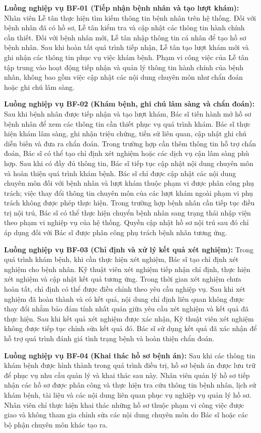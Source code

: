 \textbf{Luồng nghiệp vụ BF-01 (Tiếp nhận bệnh nhân và tạo lượt khám):}
Nhân viên Lễ tân thực hiện tìm kiếm thông tin bệnh nhân trên hệ thống. Đối với bệnh nhân đã có hồ sơ, Lễ tân kiểm tra và cập nhật các thông tin hành chính cần thiết. Đối với bệnh nhân mới, Lễ tân nhập thông tin cá nhân để tạo hồ sơ bệnh nhân. Sau khi hoàn tất quá trình tiếp nhận, Lễ tân tạo lượt khám mới và ghi nhận các thông tin phục vụ việc khám bệnh. Phạm vi công việc của Lễ tân tập trung vào hoạt động tiếp nhận và quản lý thông tin hành chính của bệnh nhân, không bao gồm việc cập nhật các nội dung chuyên môn như chẩn đoán hoặc ghi chú lâm sàng.

\textbf{Luồng nghiệp vụ BF-02 (Khám bệnh, ghi chú lâm sàng và chẩn đoán):}
Sau khi bệnh nhân được tiếp nhận và tạo lượt khám, Bác sĩ tiến hành mở hồ sơ bệnh nhân để xem các thông tin cần thiết phục vụ quá trình khám. Bác sĩ thực hiện khám lâm sàng, ghi nhận triệu chứng, tiền sử liên quan, cập nhật ghi chú diễn biến và đưa ra chẩn đoán. Trong trường hợp cần thêm thông tin hỗ trợ chẩn đoán, Bác sĩ có thể tạo chỉ định xét nghiệm hoặc các dịch vụ cận lâm sàng phù hợp. Sau khi có đầy đủ thông tin, Bác sĩ tiếp tục cập nhật nội dung chuyên môn và hoàn thiện quá trình khám bệnh. Bác sĩ chỉ được cập nhật các nội dung chuyên môn đối với bệnh nhân và lượt khám thuộc phạm vi được phân công phụ trách; việc thay đổi thông tin chuyên môn của các lượt khám ngoài phạm vi phụ trách không được phép thực hiện. Trong trường hợp bệnh nhân cần tiếp tục điều trị nội trú, Bác sĩ có thể thực hiện chuyển bệnh nhân sang trạng thái nhập viện theo phạm vi nghiệp vụ của hệ thống. Quyền cập nhật hồ sơ nội trú sau đó chỉ áp dụng đối với Bác sĩ được phân công phụ trách bệnh nhân tương ứng.

\textbf{Luồng nghiệp vụ BF-03 (Chỉ định và xử lý kết quả xét nghiệm):}
Trong quá trình khám bệnh, khi cần thực hiện xét nghiệm, Bác sĩ tạo chỉ định xét nghiệm cho bệnh nhân. Kỹ thuật viên xét nghiệm tiếp nhận chỉ định, thực hiện xét nghiệm và cập nhật kết quả tương ứng. Trong thời gian xét nghiệm chưa hoàn tất, chỉ định có thể được điều chỉnh theo yêu cầu nghiệp vụ. Sau khi xét nghiệm đã hoàn thành và có kết quả, nội dung chỉ định liên quan không được thay đổi nhằm bảo đảm tính nhất quán giữa yêu cầu xét nghiệm và kết quả đã thực hiện. Sau khi kết quả xét nghiệm được xác nhận, Kỹ thuật viên xét nghiệm không được tiếp tục chỉnh sửa kết quả đó. Bác sĩ sử dụng kết quả đã xác nhận để hỗ trợ quá trình đánh giá tình trạng bệnh và hoàn thiện chẩn đoán.

\textbf{Luồng nghiệp vụ BF-04 (Khai thác hồ sơ bệnh án):}
Sau khi các thông tin khám bệnh được hình thành trong quá trình điều trị, hồ sơ bệnh án được lưu trữ để phục vụ nhu cầu quản lý và khai thác sau này. Nhân viên quản lý hồ sơ tiếp nhận các hồ sơ được phân công và thực hiện tra cứu thông tin bệnh nhân, lịch sử khám bệnh, tài liệu và các nội dung liên quan phục vụ nghiệp vụ quản lý hồ sơ. Nhân viên chỉ thực hiện khai thác những hồ sơ thuộc phạm vi công việc được giao và không tham gia chỉnh sửa các nội dung chuyên môn do Bác sĩ hoặc các bộ phận chuyên môn khác tạo ra.

